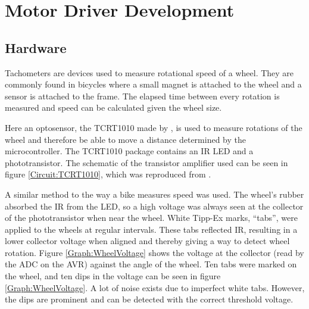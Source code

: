 \section{Motor Driver Development}\label{Section:Motor_Dev}

\subsection{Hardware}
Tachometers are devices used to measure rotational speed of a wheel. They are commonly found in bicycles where a small magnet is attached to the wheel and a sensor is attached to the frame. The elapsed time between every rotation is measured and speed can be calculated given the wheel size. 

Here an optosensor, the TCRT1010 made by \cite{Vishay:TCRT1010:Datasheet}, is used to measure rotations of the wheel and therefore be able to move a distance determined by the microcontroller. The TCRT1010 package contains an IR LED and a phototransistor. The schematic of the transistor amplifier used can be seen in figure \ref{Circuit:TCRT1010}, which was reproduced from \cite{c9Lab:SRG}. 

A similar method to the way a bike measures speed was used. The wheel's rubber absorbed the IR from the LED, so a high voltage was always seen at the collector of the phototransistor when near the wheel. White Tipp-Ex marks, ``tabs'', were applied to the wheels at regular intervals. These tabs reflected IR, resulting in a lower collector voltage when aligned and thereby giving a way to detect wheel rotation. Figure \ref{Graph:WheelVoltage} shows the voltage at the collector (read by the ADC on the AVR) against the angle of the wheel. Ten tabs were marked on the wheel, and ten dips in the voltage can be seen in figure \ref{Graph:WheelVoltage}. A lot of noise exists due to imperfect white tabs. However, the dips are prominent and can be detected with the correct threshold voltage.


